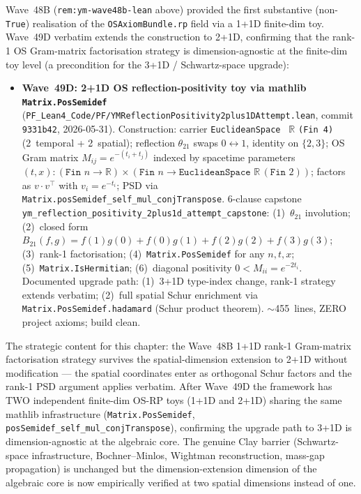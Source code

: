 \begin{remark}\label{rem:ym-wave49d-lean}
Wave~48B (\texttt{rem:ym-wave48b-lean} above) provided the first substantive (non-\texttt{True}) realisation of the \texttt{OSAxiomBundle.rp} field via a 1+1D finite-dim toy. Wave~49D verbatim extends the construction to 2+1D, confirming that the rank-1 OS Gram-matrix factorisation strategy is dimension-agnostic at the finite-dim toy level (a precondition for the 3+1D / Schwartz-space upgrade):
\begin{itemize}
  \item \textbf{Wave~49D: 2+1D OS reflection-positivity toy via mathlib \texttt{Matrix.PosSemidef}} (\texttt{PF\_Lean4\_Code/PF/YMReflectionPositivity2plus1DAttempt.lean}, commit \texttt{9331b42}, 2026-05-31). Construction: carrier \texttt{EuclideanSpace } $\mathbb{R}$ \texttt{(Fin 4)} (2~temporal + 2~spatial); reflection $\theta_{21}$ swaps $0 \leftrightarrow 1$, identity on $\{2, 3\}$; OS Gram matrix $M_{ij} = e^{-(t_i + t_j)}$ indexed by spacetime parameters $(t, x) : (\texttt{Fin } n \to \mathbb{R}) \times (\texttt{Fin } n \to \texttt{EuclideanSpace } \mathbb{R}\,(\texttt{Fin } 2))$; factors as $v \cdot v^\top$ with $v_i = e^{-t_i}$; PSD via \texttt{Matrix.posSemidef\_self\_mul\_conjTranspose}. 6-clause capstone \texttt{ym\_reflection\_positivity\_2plus1d\_attempt\_capstone}: (1)~$\theta_{21}$ involution; (2)~closed form $B_{21}(f, g) = f(1) g(0) + f(0) g(1) + f(2) g(2) + f(3) g(3)$; (3)~rank-1 factorisation; (4)~\texttt{Matrix.PosSemidef} for any $n, t, x$; (5)~\texttt{Matrix.IsHermitian}; (6)~diagonal positivity $0 < M_{ii} = e^{-2 t_i}$. Documented upgrade path: (1)~3+1D type-index change, rank-1 strategy extends verbatim; (2)~full spatial Schur enrichment via \texttt{Matrix.PosSemidef.hadamard} (Schur product theorem). $\sim$455~lines, ZERO project axioms; build clean.
\end{itemize}
The strategic content for this chapter: the Wave~48B 1+1D rank-1 Gram-matrix factorisation strategy survives the spatial-dimension extension to 2+1D without modification --- the spatial coordinates enter as orthogonal Schur factors and the rank-1 PSD argument applies verbatim. After Wave~49D the framework has TWO independent finite-dim OS-RP toys (1+1D and 2+1D) sharing the same mathlib infrastructure (\texttt{Matrix.PosSemidef}, \texttt{posSemidef\_self\_mul\_conjTranspose}), confirming the upgrade path to 3+1D is dimension-agnostic at the algebraic core. The genuine Clay barrier (Schwartz-space infrastructure, Bochner--Minlos, Wightman reconstruction, mass-gap propagation) is unchanged but the dimension-extension dimension of the algebraic core is now empirically verified at two spatial dimensions instead of one.


\end{remark}
